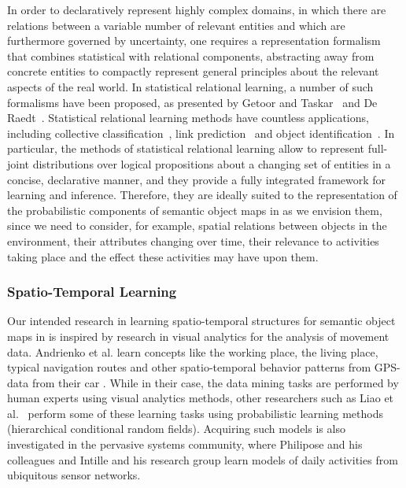 In order to declaratively represent highly complex domains, in which there are relations between a variable
number of relevant entities and which are furthermore governed by uncertainty, one requires a representation
formalism that combines statistical with relational components, abstracting away from concrete entities
to compactly represent general principles about the relevant aspects of the real world.
In statistical relational learning, a number of such formalisms have been proposed,
as presented by Getoor and Taskar~\cite{getoor07introduction} and De Raedt~\cite{DeRaedt08Learning}.
Statistical relational learning methods have countless applications, including collective classification~\cite{neville03collective},
link prediction~\cite{taskar03link} and object identification~\cite{singla06entity}.
In particular, the methods of statistical relational learning allow
to represent full-joint distributions over logical propositions about a changing set of entities in
a concise, declarative manner, and they provide a fully integrated framework for learning and inference. Therefore,
they are ideally suited to the representation of the probabilistic components of semantic object maps in \ksem as we envision them,
since we need to consider, for example, spatial relations between objects in the environment, their attributes
changing over time, their relevance to activities taking place and the effect these activities may have upon them.

\subsubsection{Spatio-Temporal Learning}
\label{sec:spatio-temporal-learning}

Our intended research in learning spatio-temporal structures for
semantic object maps in \ksem is inspired by research in visual analytics for the analysis
of movement data. Andrienko et al. learn concepts like the
working place, the living place, typical navigation routes and other
spatio-temporal behavior patterns from GPS-data from their car
\cite{Andrienko07}. While in their case, the data mining tasks are
performed by human experts using visual analytics methods, other
researchers such as Liao et al.\ \cite{Liao07a,Liao07b} perform some
of these learning tasks using probabilistic learning
methods (hierarchical conditional random fields).
Acquiring such models is also investigated in the pervasive
systems community, where Philipose and his colleagues
\cite{Pentney07,Landwehr07} and Intille and his research group
\cite{Intille06} learn models of daily activities from ubiquitous
sensor networks.

